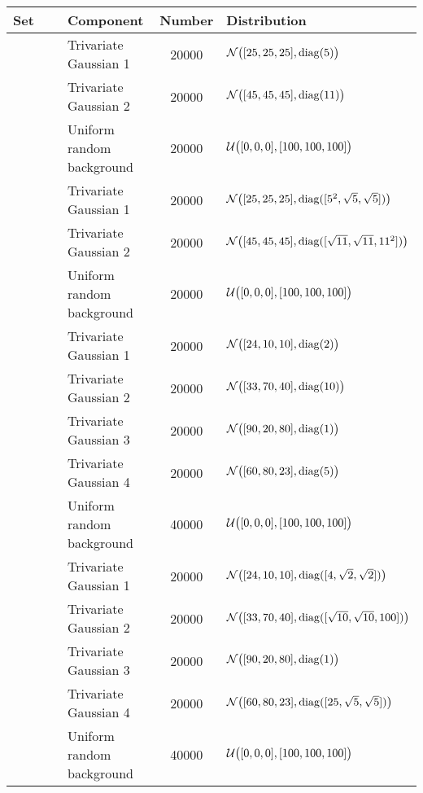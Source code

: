 
\begin{tabular}{@{}cclSl@{}}
\toprule
Set 			&~						& Component					& {Number} 	& Distribution\\
\midrule
\ferdosiTwo 	&\legendComponentOne	& Trivariate Gaussian 1		& 20000		& $\mathcal{N}\big([25, 25, 25], \operatorname{diag}(5)\big)$\\
~ 				&\legendComponentTwo	& Trivariate Gaussian 2		& 20000		& $\mathcal{N}\big([45, 45, 45], \operatorname{diag}(11)\big)$\\
~ 				&\legendComponentNoise	& Uniform random background	& 20000		& $\mathcal{U}\big([0, 0, 0], [100, 100, 100]\big)$\\
\hline
\baakmanTwo		&\legendComponentOne	& Trivariate Gaussian 1		& 20000		& $\mathcal{N}\big([25, 25, 25], \operatorname{diag}([5^2, \sqrt{5}, \sqrt{5}])\big)$\\
~ 				&\legendComponentTwo	& Trivariate Gaussian 2		& 20000		& $\mathcal{N}\big([45, 45, 45], \operatorname{diag}([\sqrt{11}, \sqrt{11}, 11^2])\big)$\\
~ 				&\legendComponentNoise	& Uniform random background	& 20000		& $\mathcal{U}\big([0, 0, 0], [100, 100, 100]\big)$\\
\hline
\ferdosiThree	&\legendComponentOne 	& Trivariate Gaussian 1 	& 20000		& $\mathcal{N}\big([24, 10, 10], \operatorname{diag}(2)\big)$\\
~ 				&\legendComponentTwo	& Trivariate Gaussian 2 	& 20000		& $\mathcal{N}\big([33, 70, 40], \operatorname{diag}(10)\big)$\\
~ 				&\legendComponentThree	& Trivariate Gaussian 3 	& 20000		& $\mathcal{N}\big([90, 20, 80], \operatorname{diag}(1)\big)$\\
~ 				&\legendComponentFour	& Trivariate Gaussian 4 	& 20000		& $\mathcal{N}\big([60, 80, 23], \operatorname{diag}(5)\big)$\\
~ 				&\legendComponentNoise	& Uniform random background	& 40000		& $\mathcal{U}\big([0, 0, 0], [100, 100, 100]\big)$\\
\hline
\baakmanThree	&\legendComponentOne 	& Trivariate Gaussian 1 	& 20000		& $\mathcal{N}\big([24, 10, 10], \operatorname{diag}([4, \sqrt{2}, \sqrt{2}])\big)$\\
~ 				&\legendComponentTwo	& Trivariate Gaussian 2 	& 20000		& $\mathcal{N}\big([33, 70, 40], \operatorname{diag}([\sqrt{10}, \sqrt{10}, 100])\big)$\\
~ 				&\legendComponentThree	& Trivariate Gaussian 3 	& 20000		& $\mathcal{N}\big([90, 20, 80], \operatorname{diag}(1)\big)$\\
~ 				&\legendComponentFour	& Trivariate Gaussian 4 	& 20000		& $\mathcal{N}\big([60, 80, 23], \operatorname{diag}([25, \sqrt{5}, \sqrt{5}])\big)$\\
~ 				&\legendComponentNoise	& Uniform random background	& 40000		& $\mathcal{U}\big([0, 0, 0], [100, 100, 100]\big)$\\
\bottomrule
\end{tabular}